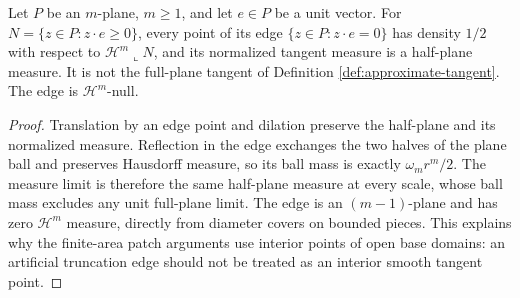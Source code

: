 \begin{example}\label{ex:halfplane-patch-edge}
Let $P$ be an $m$-plane, $m\geq1$, and let $e\in P$ be a unit vector. For $N=\{z\in P:z\cdot e\geq0\}$, every point of its edge $\{z\in P:z\cdot e=0\}$ has density $1/2$ with respect to $\mathcal H^m\llcorner N$, and its normalized tangent measure is a half-plane measure. It is not the full-plane tangent of Definition \ref{def:approximate-tangent}. The edge is $\mathcal H^m$-null.
\end{example}
\begin{proof}
Translation by an edge point and dilation preserve the half-plane and its normalized measure. Reflection in the edge exchanges the two halves of the plane ball and preserves Hausdorff measure, so its ball mass is exactly $\omega_mr^m/2$. The measure limit is therefore the same half-plane measure at every scale, whose ball mass excludes any unit full-plane limit. The edge is an $(m-1)$-plane and has zero $\mathcal H^m$ measure, directly from diameter covers on bounded pieces. This explains why the finite-area patch arguments use interior points of open base domains: an artificial truncation edge should not be treated as an interior smooth tangent point.
\end{proof}
